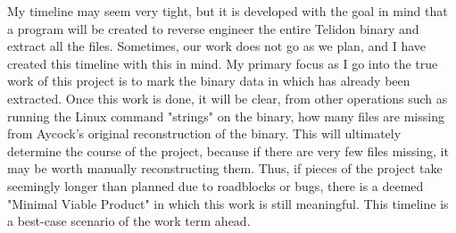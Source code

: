 \documentclass[sigconf]{acmart}
\begin{document}
My timeline may seem very tight, but it is developed with the goal in mind that a program will be created to reverse engineer the entire Telidon binary and extract all the files. Sometimes, our work does not go as we plan, and I have created this timeline with this in mind. My primary focus as I go into the true work of this project is to mark the binary data in which has already been extracted. Once this work is done, it will be clear, from other operations such as running the Linux command "strings" on the binary, how many files are missing from Aycock's original reconstruction of the binary. This will ultimately determine the course of the project, because if there are very few files missing, it may be worth manually reconstructing them. Thus, if pieces of the project take seemingly longer than planned due to roadblocks or bugs, there is a deemed "Minimal Viable Product" in which this work is still meaningful. This timeline is a best-case scenario of the work term ahead. 





\appendix
\end{document}
